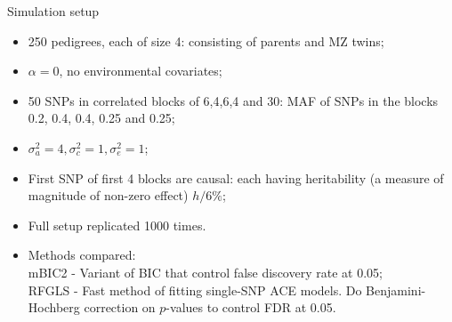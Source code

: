 \documentclass[handout,10pt]{beamer}
\begin{document}

\begin{frame}{Simulation setup}
\begin{itemize}
\item 250 pedigrees, each of size 4: consisting of parents and MZ twins;
\item $\alpha = 0$, no environmental covariates;
\item 50 SNPs in correlated blocks of 6,4,6,4 and 30: MAF of SNPs in the blocks 0.2, 0.4, 0.4, 0.25 and 0.25;
\item $\sigma^2_a = 4, \sigma^2_c = 1, \sigma^2_e = 1$;
\item First SNP of first 4 blocks are causal: each having heritability (a measure of magnitude of non-zero effect) $h/6 \%$;
\item Full setup replicated 1000 times.

\vspace{1em}
\item Methods compared:\\
{\colb mBIC2} - Variant of BIC that control false discovery rate at 0.05;\\
{\colb RFGLS} - Fast method of fitting single-SNP ACE models. Do Benjamini-Hochberg correction on $p$-values to control FDR at 0.05.
\end{itemize}
\end{frame}
\end{document}
